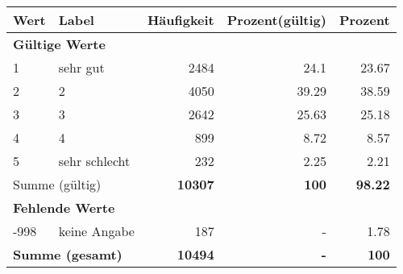      \begin{longtable}{lXrrr}
     \toprule
     \textbf{Wert} & \textbf{Label} & \textbf{Häufigkeit} & \textbf{Prozent(gültig)} & \textbf{Prozent} \\
     \endhead
     \midrule
     \multicolumn{5}{l}{\textbf{Gültige Werte}}\\

     1 &
     \multicolumn{1}{X}{ sehr gut   } &


       \num{2484} &
       \num[round-mode=places,round-precision=2]{24,1} &
         \num[round-mode=places,round-precision=2]{23,67} \\

     2 &
     \multicolumn{1}{X}{ 2   } &


       \num{4050} &
       \num[round-mode=places,round-precision=2]{39,29} &
         \num[round-mode=places,round-precision=2]{38,59} \\

     3 &
     \multicolumn{1}{X}{ 3   } &


       \num{2642} &
       \num[round-mode=places,round-precision=2]{25,63} &
         \num[round-mode=places,round-precision=2]{25,18} \\

     4 &
     \multicolumn{1}{X}{ 4   } &


       \num{899} &
       \num[round-mode=places,round-precision=2]{8,72} &
         \num[round-mode=places,round-precision=2]{8,57} \\

     5 &
     \multicolumn{1}{X}{ sehr schlecht   } &


       \num{232} &
       \num[round-mode=places,round-precision=2]{2,25} &
         \num[round-mode=places,round-precision=2]{2,21} \\
     \midrule
     \multicolumn{2}{l}{Summe (gültig)} &
       \textbf{\num{10307}} &
     \textbf{100} &
       \textbf{\num[round-mode=places,round-precision=2]{98,22}} \\
     \multicolumn{5}{l}{\textbf{Fehlende Werte}}\\
       -998 &
       keine Angabe &
         \num{187} &
        - &
         \num[round-mode=places,round-precision=2]{1,78} \\
     \midrule
     \multicolumn{2}{l}{\textbf{Summe (gesamt)}} &
          \textbf{\num{10494}} &
        \textbf{-} &
        \textbf{100} \\
     \bottomrule
     \end{longtable}
     
